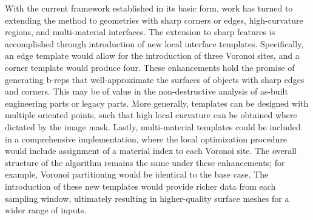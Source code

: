 With the current framework established in its basic form, work has turned to extending the method to geometries with sharp corners or edges, high-curvature regions, and multi-material interfaces. The extension to sharp features is accomplished through introduction of new local interface templates. Specifically, an edge template would allow for the introduction of three Voronoi sites, and a corner template would produce four. These enhancements hold the promise of generating b-reps that well-approximate the surfaces of objects with sharp edges and corners. This may be of value in the non-destructive analysis of as-built engineering parts or legacy parts. More generally, templates can be designed with multiple oriented points, such that high local curvature can be obtained where dictated by the image mask.  Lastly, multi-material templates could be included in a comprehensive implementation, where the local optimization procedure would include assignment of a material index to each Voronoi site. The overall structure of the algorithm remains the same under these enhancements; for example, Voronoi partitioning would be identical to the base case. The introduction of these new templates would provide richer data from each sampling window, ultimately resulting in higher-quality surface meshes for a wider range of inputs.